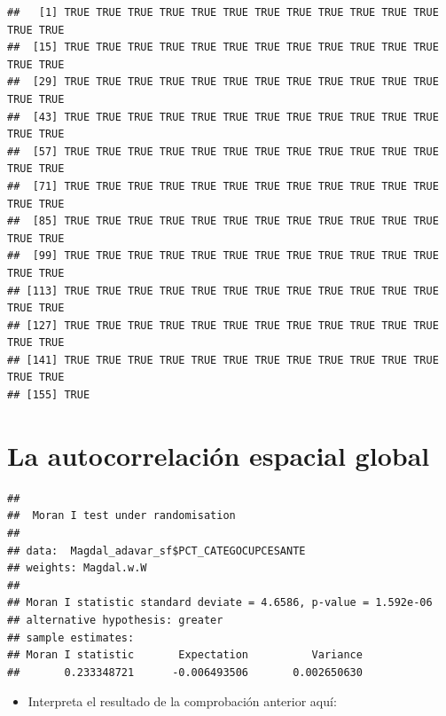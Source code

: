 \documentclass[11pt,]{article}
\newenvironment{Shaded}{\begin{snugshade}}{\end{snugshade}}
\newcommand{\KeywordTok}[1]{\textcolor[rgb]{0.13,0.29,0.53}{\textbf{#1}}}
\newcommand{\DataTypeTok}[1]{\textcolor[rgb]{0.13,0.29,0.53}{#1}}
\newcommand{\StringTok}[1]{\textcolor[rgb]{0.31,0.60,0.02}{#1}}
\newcommand{\OperatorTok}[1]{\textcolor[rgb]{0.81,0.36,0.00}{\textbf{#1}}}
\newcommand{\NormalTok}[1]{#1}
\providecommand{\tightlist}{%
\setlength{\itemsep}{0pt}\setlength{\parskip}{0pt}}
\begin{document}
\begin{verbatim}
##   [1] TRUE TRUE TRUE TRUE TRUE TRUE TRUE TRUE TRUE TRUE TRUE TRUE TRUE TRUE
##  [15] TRUE TRUE TRUE TRUE TRUE TRUE TRUE TRUE TRUE TRUE TRUE TRUE TRUE TRUE
##  [29] TRUE TRUE TRUE TRUE TRUE TRUE TRUE TRUE TRUE TRUE TRUE TRUE TRUE TRUE
##  [43] TRUE TRUE TRUE TRUE TRUE TRUE TRUE TRUE TRUE TRUE TRUE TRUE TRUE TRUE
##  [57] TRUE TRUE TRUE TRUE TRUE TRUE TRUE TRUE TRUE TRUE TRUE TRUE TRUE TRUE
##  [71] TRUE TRUE TRUE TRUE TRUE TRUE TRUE TRUE TRUE TRUE TRUE TRUE TRUE TRUE
##  [85] TRUE TRUE TRUE TRUE TRUE TRUE TRUE TRUE TRUE TRUE TRUE TRUE TRUE TRUE
##  [99] TRUE TRUE TRUE TRUE TRUE TRUE TRUE TRUE TRUE TRUE TRUE TRUE TRUE TRUE
## [113] TRUE TRUE TRUE TRUE TRUE TRUE TRUE TRUE TRUE TRUE TRUE TRUE TRUE TRUE
## [127] TRUE TRUE TRUE TRUE TRUE TRUE TRUE TRUE TRUE TRUE TRUE TRUE TRUE TRUE
## [141] TRUE TRUE TRUE TRUE TRUE TRUE TRUE TRUE TRUE TRUE TRUE TRUE TRUE TRUE
## [155] TRUE
\end{verbatim}

\section{La autocorrelación espacial
global}\label{la-autocorrelaciuxf3n-espacial-global}

\begin{Shaded}
\end{Shaded}

\begin{verbatim}
## 
##  Moran I test under randomisation
## 
## data:  Magdal_adavar_sf$PCT_CATEGOCUPCESANTE  
## weights: Magdal.w.W    
## 
## Moran I statistic standard deviate = 4.6586, p-value = 1.592e-06
## alternative hypothesis: greater
## sample estimates:
## Moran I statistic       Expectation          Variance 
##       0.233348721      -0.006493506       0.002650630
\end{verbatim}

\begin{itemize}
\tightlist
\item
  Interpreta el resultado de la comprobación anterior aquí:
\end{itemize}
\end{document}
